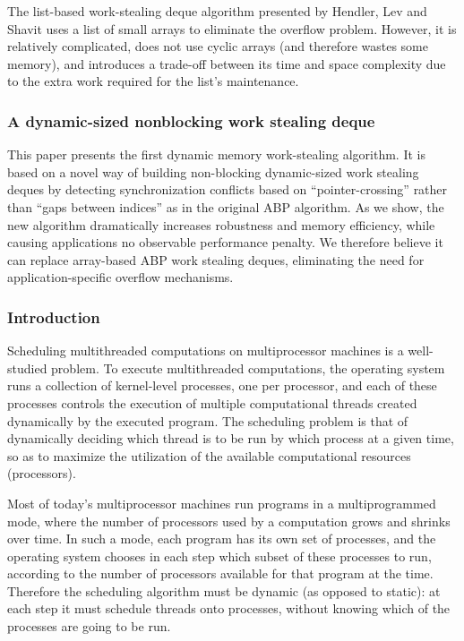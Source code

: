 The list-based work-stealing deque algorithm presented by Hendler, Lev
and Shavit \cite{Hendler2006, Hendler2006a} uses a list of small
arrays to eliminate the overflow problem. However, it is relatively
complicated, does not use cyclic arrays (and therefore wastes some
memory), and introduces a trade-off between its time and space
complexity due to the extra work required for the list's maintenance.

\subsubsection{A dynamic-sized nonblocking work stealing deque
  \cite{Hendler2006, Hendler2006a}}

This paper presents the first dynamic memory work-stealing
algorithm. It is based on a novel way of building non-blocking
dynamic-sized work stealing deques by detecting synchronization
conflicts based on ``pointer-crossing'' rather than ``gaps between
indices'' as in the original ABP algorithm. As we show, the new
algorithm dramatically increases robustness and memory efficiency,
while causing applications no observable performance penalty. We
therefore believe it can replace array-based ABP work stealing deques,
eliminating the need for application-specific overflow mechanisms.

\subsubsection{Introduction}

Scheduling multithreaded computations on multiprocessor machines is a
well-studied problem. To execute multithreaded computations, the
operating system runs a collection of kernel-level processes, one per
processor, and each of these processes controls the execution of
multiple computational threads created dynamically by the executed
program. The scheduling problem is that of dynamically deciding which
thread is to be run by which process at a given time, so as to
maximize the utilization of the available computational resources
(processors).

Most of today's multiprocessor machines run programs in a
multiprogrammed mode, where the number of processors used by a
computation grows and shrinks over time. In such a mode, each program
has its own set of processes, and the operating system chooses in each
step which subset of these processes to run, according to the number
of processors available for that program at the time. Therefore the
scheduling algorithm must be dynamic (as opposed to static): at each
step it must schedule threads onto processes, without knowing which of
the processes are going to be run.

